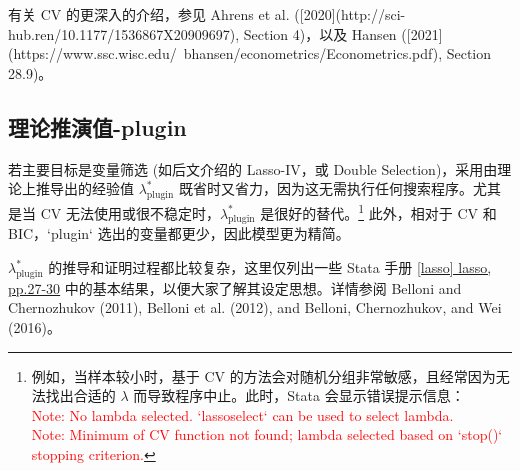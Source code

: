 有关 CV 的更深入的介绍，参见 Ahrens et al. ([2020](http://sci-hub.ren/10.1177/1536867X20909697), Section 4)，以及 Hansen ([2021](https://www.ssc.wisc.edu/~bhansen/econometrics/Econometrics.pdf), Section 28.9)。


\subsection{理论推演值-plugin}\label{sec:lasso-plugin}



若主要目标是变量筛选 (如后文介绍的 Lasso-IV，或 Double Selection)，采用由理论上推导出的经验值 $\lambda_{\text{plugin}}^*$ 既省时又省力，因为这无需执行任何搜索程序。尤其是当 CV 无法使用或很不稳定时，$\lambda_{\text{plugin}}^*$ 是很好的替代。\footnote{%
   例如，当样本较小时，基于 CV 的方法会对随机分组非常敏感，且经常因为无法找出合适的 $\lambda$ 而导致程序中止。此时，Stata 会显示错误提示信息：{\\ \textcolor{red}{Note: No lambda selected. `lassoselect` can be used to select lambda. \\
   Note: Minimum of CV function not found; lambda selected based on `stop()` stopping criterion.}}}
此外，相对于 CV 和 BIC，`plugin` 选出的变量都更少，因此模型更为精简。


$\lambda_{\text{plugin}}^*$ 的推导和证明过程都比较复杂，这里仅列出一些 Stata 手册 \href{https://www.stata.com/manuals/lassolasso.pdf}{[lasso] lasso, pp.27-30} 
中的基本结果，以便大家了解其设定思想。详情参阅 Belloni and Chernozhukov (2011), Belloni et al. (2012), and Belloni, Chernozhukov, and Wei (2016)。

